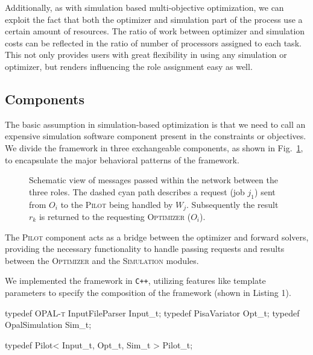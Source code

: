 \documentclass[%
reprint,
amsmath,amssymb,
aps,
prstab,
]{revtex4-1}
\begin{document}
Additionally, as with simulation based multi-objective optimization, we can
  exploit the fact that both the optimizer and simulation part of the process
  use a certain amount of resources.
The ratio of work between optimizer and simulation costs can be reflected in
  the ratio of number of processors assigned to each task.
This not only provides users with  great flexibility in using any simulation
  or optimizer, but renders influencing the role assignment easy as well.


\subsection{Components}

The basic assumption in simulation-based optimization is that we need to
  call an expensive simulation software component present in the
  constraints or objectives.
We divide the framework in three exchangeable components, as shown in
  Fig.~\ref{fig:opt-framework-layout}, to encapsulate the major behavioral
  patterns of the framework.
%
\begin{figure}
  \centering
  \scalebox{0.85}{
  \begin{tikzpicture}[text=black]
  
  \end{tikzpicture}
}
  

  \caption{Schematic view of messages passed within the network between the
    three roles.
  The dashed cyan path describes a request (job $j_1$) sent from $O_i$ to the
  \textsc{Pilot} being handled by $W_j$. Subsequently the result $r_k$ is
  returned to the requesting \textsc{Optimizer} ($O_i$).}
  \label{fig:opt-framework-layout}
\end{figure}

%
The \textsc{Pilot} component acts as a bridge between the optimizer and
  forward solvers, providing the necessary functionality to handle passing
  requests and results between the \textsc{Optimizer} and the
  \textsc{Simulation} modules.

We implemented the framework in \texttt{C++}, utilizing features like template
  parameters to specify the composition of the framework (shown in Listing 1).

\begin{code}
typedef  \textsc{OPAL-t} InputFileParser Input_t;
typedef PisaVariator        Opt_t;
typedef OpalSimulation      Sim_t;

typedef Pilot< Input_t, Opt_t, Sim_t > Pilot_t;
\end{code}
\end{document}
